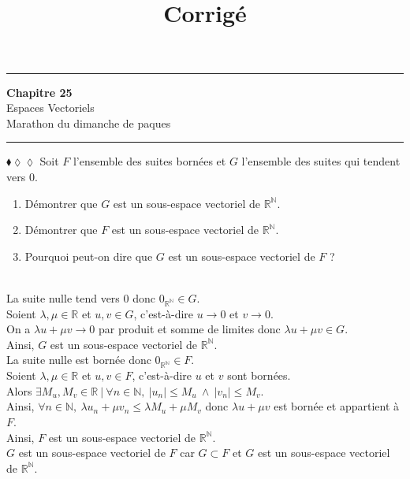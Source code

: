 \documentclass[11pt]{article}
\title{\bf{\pagetitle}\\\large{Corrigé}}
\def\pagetitle{Espaces Vectoriels}
\newcommand*{\R}{\mathbb{R}}
\newcommand*{\N}{\mathbb{N}}
\begin{document}
\thispagestyle{fancy}
\fancyhead[C]{\pagetitle}

\hrule
\begin{center}
    \LARGE{\textbf{Chapitre 25}}\\
    \large{Espaces Vectoriels}\\
    \small{Marathon du dimanche de paques}
    \rule{0.8\textwidth}{0.5pt}
\end{center}


\vspace{0.5cm}

\begin{exercise}{$\blacklozenge\lozenge\lozenge$}{}
    Soit $F$ l'ensemble des suites bornées et $G$ l'ensemble des suites qui tendent vers 0.
    \begin{enumerate}[topsep=0pt,itemsep=-0.9ex]
        \item Démontrer que $G$ est un sous-espace vectoriel de $\R^\N$.
        \item Démontrer que $F$ est un sous-espace vectoriel de $\R^\N$.
        \item Pourquoi peut-on dire que $G$ est un sous-espace vectoriel de $F$ ?
    \end{enumerate}
    \tcblower\\[0.2cm]
     La suite nulle tend vers 0 donc $0_{\R^\N} \in G$.\\
    Soient $\lambda, \mu \in \R$ et $u, v \in G$, c'est-à-dire $u \to 0$ et $v \to 0$.\\
    On a $\lambda u + \mu v \to 0$ par produit et somme de limites donc $\lambda u + \mu v \in G$.\\
    Ainsi, $G$ est un sous-espace vectoriel de $\R^\N$.\\[0.3cm]
      La suite nulle est bornée donc $0_{\R^\N} \in F$.\\
    Soient $\lambda, \mu \in \R$ et $u, v \in F$, c'est-à-dire $u$ et $v$ sont bornées.\\
    Alors $\exists M_u, M_v \in \R ~ | ~ \forall n \in \N, ~ |u_n| \leq M_u ~ \wedge ~  |v_n| \leq M_v$.\\
    Ainsi, $\forall n \in \N, ~ \lambda u_n + \mu v_n \leq \lambda M_u + \mu M_v$ donc $\lambda u + \mu v$ est bornée et appartient à $F$.\\
    Ainsi, $F$ est un sous-espace vectoriel de $\R^\N$.\\[0.3cm]
     $G$ est un sous-espace vectoriel de $F$ car $G \subset F$ et $G$ est un sous-espace vectoriel de $\R^\N$.
\end{exercise}
\end{document}

